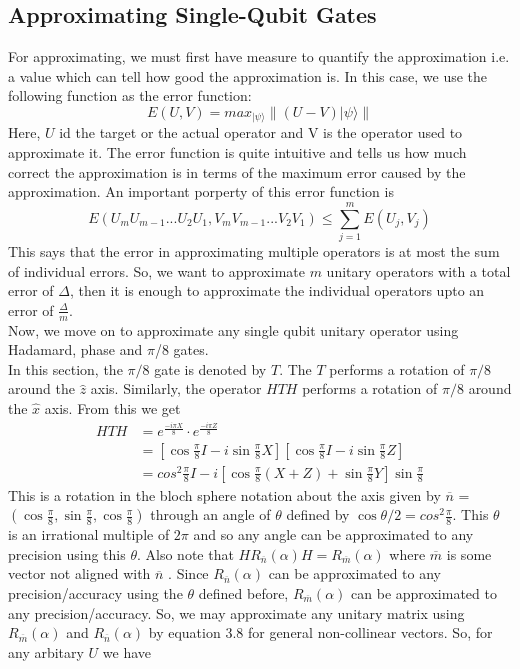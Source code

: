 \subsection{Approximating Single-Qubit Gates}
For approximating, we must first have measure to quantify the approximation i.e. a value which can tell how good the approximation is. In this case, we use the following function as the error function:
\begin{equation}
E(U,V) = max_{|\psi\rangle} \| (U-V)|\psi\rangle \|
\end{equation}Here, $U$ id the target or the actual operator and V is the operator used to approximate it. The error function is quite intuitive and tells us how much correct the approximation is in terms of the maximum error caused by the approximation. An important porperty of this error function is 
\begin{equation}
E(U_mU_{m-1}...U_2U_1 , V_mV_{m-1}...V_2V_1) \leq\sum_{j=1}^m E(U_j,V_j)
\end{equation}This says that the error in approximating multiple operators is at most the sum of individual errors. So, we want to approximate $m$ unitary operators with a total error of $\Delta$, then it is enough to approximate the individual operators upto an error of $\frac{\Delta}{m}$.\\
Now, we move on to approximate any single qubit unitary operator using Hadamard, phase and $\pi$/8 gates. \\
In this section, the $\pi/8$ gate is denoted by $T$. The $T$ performs a rotation of $\pi/8$ around the $\hat{z}$ axis. Similarly, the operator $HTH$ performs a rotation of $\pi/8$ around the $\hat{x}$ axis. From this we get
\begin{equation}
\begin{split}
HTH & = e^{\frac{-i\pi X}{8}} \cdot e^{\frac{-i\pi Z}{8}} \\
& = \left[\cos{\frac{\pi}{8}}I - i\sin{\frac{\pi}{8}}X \right]\left[\cos{\frac{\pi}{8}}I - i\sin{\frac{\pi}{8}}Z \right]\\
& = cos^2 \frac{\pi}{8} I - i\left[\cos{\frac{\pi}{8}}(X+Z) + \sin{\frac{\pi}{8}}Y \right] \sin{\frac{\pi}{8}}
\end{split}
\end{equation}
This is a rotation in the bloch sphere notation about the axis given by $\overline{n}$ = $(\cos{\frac{\pi}{8}},\sin{\frac{\pi}{8}},\cos{\frac{\pi}{8}})$ through an angle of $\theta$ defined by $\cos{\theta/2} = cos^2 \frac{\pi}{8}$. This $\theta$ is an irrational multiple of $2\pi$ and so any angle can be approximated to any precision using this $\theta$. Also note that $HR_{\overline{n}} (\alpha)H  = R_{\overline{m}}(\alpha)$ where $\overline{m}$ is some vector not aligned with $\overline{n}$ . Since $R_{\overline{n}}(\alpha)$ can be approximated to any precision/accuracy using the $\theta$ defined before, $R_\overline{m}(\alpha)$ can be approximated to any precision/accuracy. So, we may approximate any unitary matrix using  $R_\overline{m}(\alpha)$ and  $R_\overline{n}(\alpha)$ by equation 3.8 for general non-collinear vectors. So, for any arbitary $U$ we have
